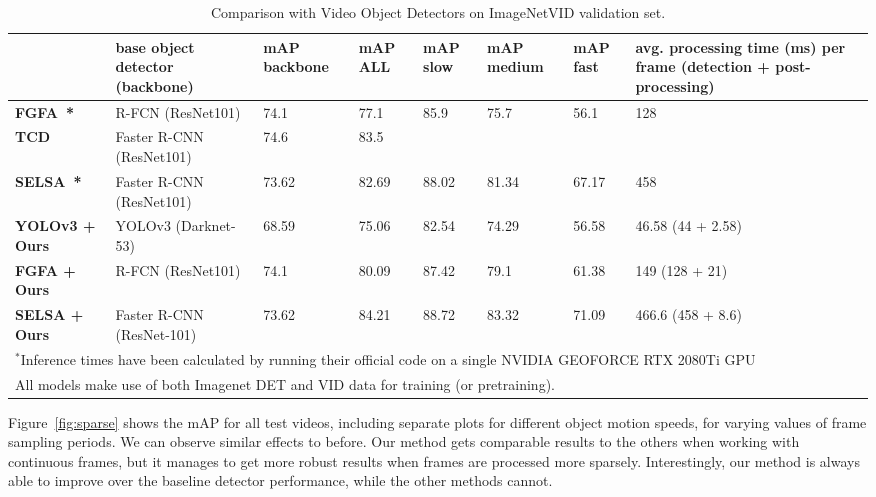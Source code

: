 \documentclass[letterpaper, 10 pt, conference]{ieeeconf}
\begin{document}
\begin{table*}[ht!]
\caption{Comparison with Video Object Detectors on ImageNetVID validation set.}
\centering
\begin{tabular}{|l||lp{1.2cm}||p{0.6cm}|p{0.6cm}|p{0.9cm}|p{0.6cm}|p{4.3cm}|}
\hline
  & \textbf{base object detector} (backbone) & \textbf{mAP backbone} & \textbf{mAP ALL} & \textbf{mAP slow} & \textbf{mAP medium} & \textbf{mAP fast} & \textbf{avg. processing time (ms) per frame (detection + post-processing)} \\ \hline
\textbf{FGFA~\cite{Zhu_2017_ICCV}*} & R-FCN (ResNet101)& 74.1 & 77.1 & 85.9 & 75.7 & 56.1 & 128  \\ \hline
\textbf{TCD~\cite{DBLP:journals/corr/abs-1811-11167}} & Faster R-CNN (ResNet101) & 74.6 & 83.5 &  &  &  & \\ \hline
\textbf{SELSA~\cite{wu2019selsa}*} & Faster R-CNN (ResNet101) & 73.62 & 82.69 & 88.02 & 81.34 & 67.17 & 458  \\ \hline
\hline
\textbf{YOLOv3 + Ours}  & YOLOv3 (Darknet-53) & 68.59 & 75.06 & 82.54 & 74.29 & 56.58 & 46.58 (44 + 2.58)  \\ \hline
\textbf{FGFA + Ours} & R-FCN (ResNet101) & 74.1 & 80.09 & 87.42 & 79.1 & 61.38 & 149 (128 + 21) \\ \hline
\textbf{SELSA + Ours}  & Faster R-CNN (ResNet-101) & 73.62 & 84.21 & 88.72 & 83.32 & 71.09 & 466.6 (458 + 8.6)  \\ \hline
\multicolumn{8}{p{15cm}}{\footnotesize{$^{*}$Inference times have been calculated by running their official code on a single NVIDIA GEOFORCE RTX 2080Ti GPU}}\\
\multicolumn{8}{p{15cm}}{\footnotesize{All models make use of both Imagenet DET and VID data for training (or pretraining).}}
\end{tabular}
\label{tab:video-comparison}
\end{table*}




Figure~\ref{fig:sparse} shows the mAP for all test videos, including separate plots for different object motion speeds, for varying values of frame sampling periods. We can observe similar effects to before. 
Our method gets comparable results to the others when working with continuous frames, but it manages to get more robust results when frames are processed more sparsely. Interestingly, our method is always able to improve over the baseline detector performance, while the other methods cannot. 
\end{document}
